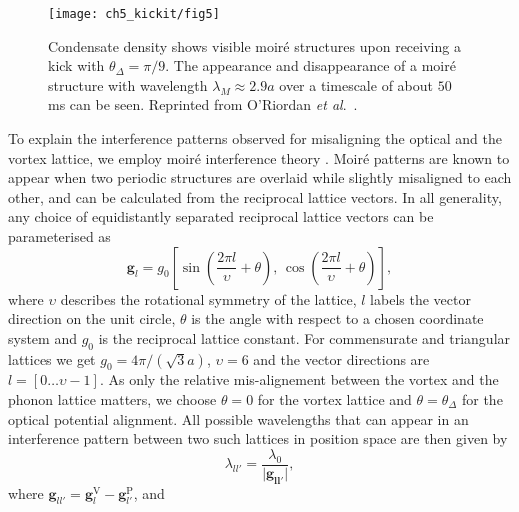 	\begin{figure}
        \centering
		\texttt{[image: ch5\_kickit/fig5]}
		\caption[Oscillation of moir\'e wavelength.]{Condensate density shows visible moir\'e structures upon receiving a kick with $\theta_\Delta=\pi/9$. The appearance and disappearance of a moir\'e structure with wavelength $\lambda_M \approx 2.9 a$ over a timescale of about $50$ ms can be seen. Reprinted from O'Riordan {\textit{et al}.}~\cite{VTX:oriordan_pra_2016}.}
		\label{fig:dtheta20_ev}
	\end{figure}

    To explain the interference patterns observed for misaligning the optical and the vortex lattice, we employ moir\'e interference theory \cite{SS:Hermann_jpcm_2012}. Moir\'e patterns are known to appear when two periodic structures are overlaid while slightly misaligned to each other, and can be calculated from the reciprocal lattice vectors. In all generality, any choice of equidistantly separated reciprocal lattice vectors can be parameterised as
    	\begin{equation}
    		\mathbf{g}_{l} = g_0 \left[ \sin\left( \frac{2\pi l}{\upsilon}+\theta \right),\, \cos\left( \frac{2\pi l}{\upsilon} +\theta\right) \right],
    	\end{equation}
    where $\upsilon$ describes the rotational symmetry of the lattice, $l$ labels the vector direction on the unit circle, $\theta$ is the angle with respect to a chosen coordinate system and $g_0$ is the reciprocal lattice constant. For commensurate and triangular lattices we get $g_0=4\pi/(\sqrt{3}a)$, $\upsilon=6$ and the vector directions are $l=\left[0\dots\upsilon-1\right]$. As only the relative mis-alignement between the vortex and the phonon lattice matters, we choose $\theta=0$ for the vortex lattice and $\theta=\theta_\Delta$ for the optical potential alignment.
    All possible wavelengths that can appear in an interference pattern between two such lattices in position space are then given by
    	\begin{equation}
    		\lambda_{ll'} = \frac{\lambda_0}{|\mathbf{\mathbf{g}_{ll'}|}},
    		\label{eq:InterferenceVectors}
    	\end{equation}
    where
    $\mathbf{g}_{ll'}=\mathbf{g}_{l}^{\text{V}}-\mathbf{g}_{l'}^{\text{P}}$, and
